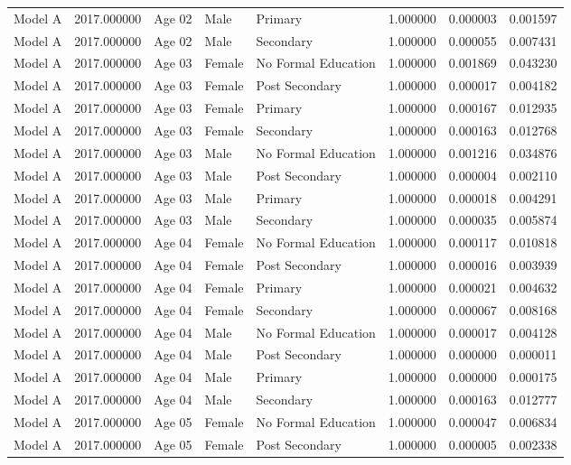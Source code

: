 \begin{table}[ht]
\begin{tabular}{lrlllrrr}
Model A & 2017.000000 & Age 02 & Male & Primary & 1.000000 & 0.000003 & 0.001597 \\
Model A & 2017.000000 & Age 02 & Male & Secondary & 1.000000 & 0.000055 & 0.007431 \\
Model A & 2017.000000 & Age 03 & Female & No Formal Education & 1.000000 & 0.001869 & 0.043230 \\
Model A & 2017.000000 & Age 03 & Female & Post Secondary & 1.000000 & 0.000017 & 0.004182 \\
Model A & 2017.000000 & Age 03 & Female & Primary & 1.000000 & 0.000167 & 0.012935 \\
Model A & 2017.000000 & Age 03 & Female & Secondary & 1.000000 & 0.000163 & 0.012768 \\
Model A & 2017.000000 & Age 03 & Male & No Formal Education & 1.000000 & 0.001216 & 0.034876 \\
Model A & 2017.000000 & Age 03 & Male & Post Secondary & 1.000000 & 0.000004 & 0.002110 \\
Model A & 2017.000000 & Age 03 & Male & Primary & 1.000000 & 0.000018 & 0.004291 \\
Model A & 2017.000000 & Age 03 & Male & Secondary & 1.000000 & 0.000035 & 0.005874 \\
Model A & 2017.000000 & Age 04 & Female & No Formal Education & 1.000000 & 0.000117 & 0.010818 \\
Model A & 2017.000000 & Age 04 & Female & Post Secondary & 1.000000 & 0.000016 & 0.003939 \\
Model A & 2017.000000 & Age 04 & Female & Primary & 1.000000 & 0.000021 & 0.004632 \\
Model A & 2017.000000 & Age 04 & Female & Secondary & 1.000000 & 0.000067 & 0.008168 \\
Model A & 2017.000000 & Age 04 & Male & No Formal Education & 1.000000 & 0.000017 & 0.004128 \\
Model A & 2017.000000 & Age 04 & Male & Post Secondary & 1.000000 & 0.000000 & 0.000011 \\
Model A & 2017.000000 & Age 04 & Male & Primary & 1.000000 & 0.000000 & 0.000175 \\
Model A & 2017.000000 & Age 04 & Male & Secondary & 1.000000 & 0.000163 & 0.012777 \\
Model A & 2017.000000 & Age 05 & Female & No Formal Education & 1.000000 & 0.000047 & 0.006834 \\
Model A & 2017.000000 & Age 05 & Female & Post Secondary & 1.000000 & 0.000005 & 0.002338 \\

\end{tabular}
\end{table}
